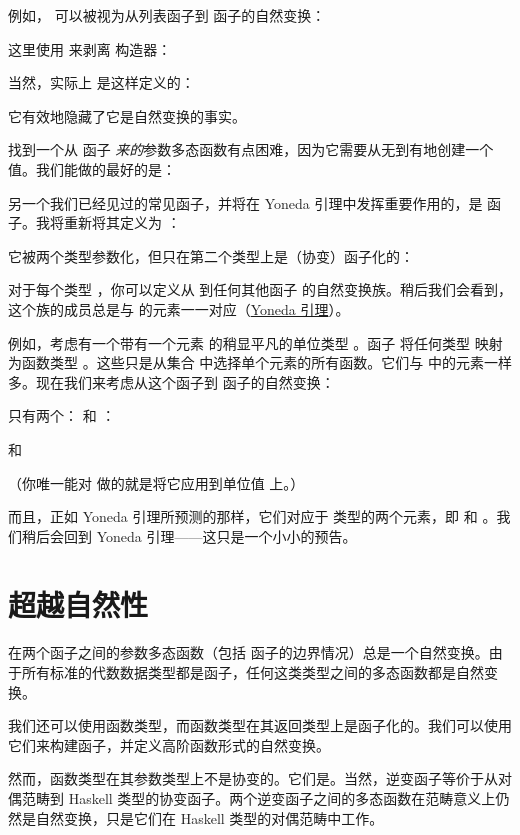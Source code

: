 例如， 可以被视为从列表函子到  函子的自然变换：

这里使用  来剥离  构造器：

当然，实际上  是这样定义的：

它有效地隐藏了它是自然变换的事实。

找到一个从  函子 \emph{来的}参数多态函数有点困难，因为它需要从无到有地创建一个值。我们能做的最好的是：

另一个我们已经见过的常见函子，并将在 Yoneda 引理中发挥重要作用的，是  函子。我将重新将其定义为 ：

它被两个类型参数化，但只在第二个类型上是（协变）函子化的：

对于每个类型 ，你可以定义从  到任何其他函子  的自然变换族。稍后我们会看到，这个族的成员总是与  的元素一一对应（\hyperref[the-yoneda-lemma]{Yoneda 引理}）。

例如，考虑有一个带有一个元素 \code{()} 的稍显平凡的单位类型 \code{()}。函子  将任何类型  映射为函数类型 。这些只是从集合  中选择单个元素的所有函数。它们与  中的元素一样多。现在我们来考虑从这个函子到  函子的自然变换：

只有两个： 和 ：

和

（你唯一能对  做的就是将它应用到单位值 \code{()} 上。）

而且，正如 Yoneda 引理所预测的那样，它们对应于  类型的两个元素，即  和 。我们稍后会回到 Yoneda 引理——这只是一个小小的预告。

\section{超越自然性}

在两个函子之间的参数多态函数（包括  函子的边界情况）总是一个自然变换。由于所有标准的代数数据类型都是函子，任何这类类型之间的多态函数都是自然变换。

我们还可以使用函数类型，而函数类型在其返回类型上是函子化的。我们可以使用它们来构建函子，并定义高阶函数形式的自然变换。

然而，函数类型在其参数类型上不是协变的。它们是。当然，逆变函子等价于从对偶范畴到 Haskell 类型的协变函子。两个逆变函子之间的多态函数在范畴意义上仍然是自然变换，只是它们在 Haskell 类型的对偶范畴中工作。

